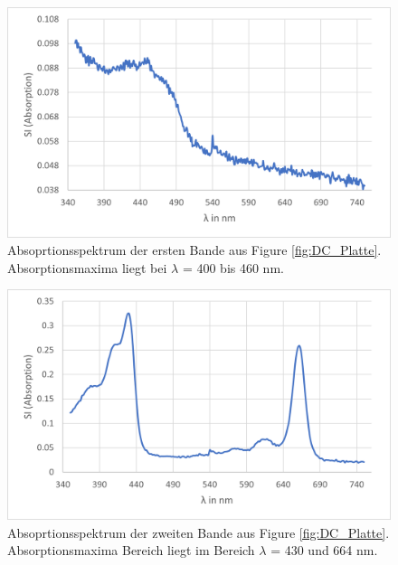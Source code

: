 \documentclass[10pt,a4paper]{article}
\begin{document}
			\begin{figure}[H]
				\centering
				\includegraphics[scale=1]{firstband_axischange.png}
				\caption{Absoprtionsspektrum der ersten Bande aus Figure \ref{fig:DC_Platte}. Absorptionsmaxima liegt bei $\lambda$ = 400 bis 460 nm.}
				\label{fig:erste Bande}
			\end{figure}
			
			\begin{figure}[H]
				\centering
				\includegraphics[scale=1]{secondband.png}
				\caption{Absoprtionsspektrum der zweiten Bande aus Figure \ref{fig:DC_Platte}. Absorptionsmaxima Bereich liegt im Bereich $\lambda$ = 430 und 664 nm.}
				\label{fig:zweite Bande}
			\end{figure}
			
\end{document}
